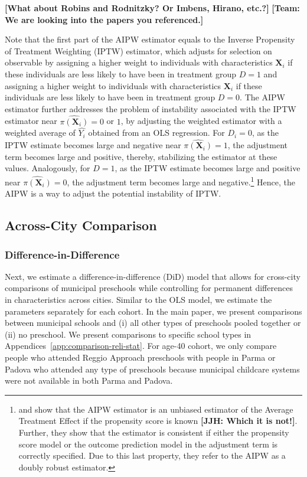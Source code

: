 \noindent \textbf{[What about Robins and Rodnitzky? Or Imbens, Hirano, etc.?]} \textbf{[Team: We are looking into the papers you referenced.]}

Note that the first part of the AIPW estimator equals to the Inverse Propensity of Treatment Weighting (IPTW) estimator, which adjusts for selection on observable by assigning a higher weight to individuals with characteristics $\boldsymbol{X}_i$ if these individuals are less likely to have been in treatment group $D = 1$ and assigning a higher weight to individuals with characteristics $\boldsymbol{X}_i$ if these individuals are less likely to have been in treatment group $D = 0$. The AIPW estimator further addresses the problem of instability associated with the IPTW estimator near $\hat{\pi(\boldsymbol{X}_i)} = 0$ or $1$, by adjusting the weighted estimator with a weighted average of $\hat{Y_i}$ obtained from an OLS regression. For $D_i = 0$, as the IPTW estimate becomes large and negative near $\hat{\pi(\boldsymbol{X}_i)} = 1$, the adjustment term becomes large and positive, thereby, stabilizing the estimator at these values. Analogously, for $D = 1$, as the IPTW estimate becomes large and positive near $\hat{\pi(\boldsymbol{X}_i)} = 0$, the adjustment term becomes large and negative.\footnote{\citet{Tsiatis_2006_Semiparametric-Theory} and \citet{Glynn-Quinn_2010_Political-Analysis} show that the AIPW estimator is an unbiased estimator of the Average Treatment Effect if the propensity score is known \textbf{[JJH: Which it is not!]}. Further, they show that the estimator is consistent if either the propensity score model or the outcome prediction model in the adjustment term is correctly specified. Due to this last property, they refer to the AIPW as a doubly robust estimator.}  Hence, the AIPW is a way to adjust the potential instability of IPTW.


\subsection{Across-City Comparison} \label{sec:across-city-analysis}
\subsubsection{Difference-in-Difference}  \label{subsubsection:DID}
Next, we estimate a difference-in-difference (DiD) model that allows for cross-city comparisons of municipal preschools while controlling for permanent differences in characteristics across cities. Similar to the OLS model, we estimate the parameters separately for each cohort. In the main paper, we present comparisons between municipal schools and (i) all other types of preschools pooled together or (ii) no preschool. We present comparisons to specific school types in Appendices~\ref{app:comparison-reli-stat}. %
For age-40 cohort, we only compare people who attended Reggio Approach preschools with people in Parma or Padova who attended any type of preschools because municipal childcare systems were not available in both Parma and Padova.

